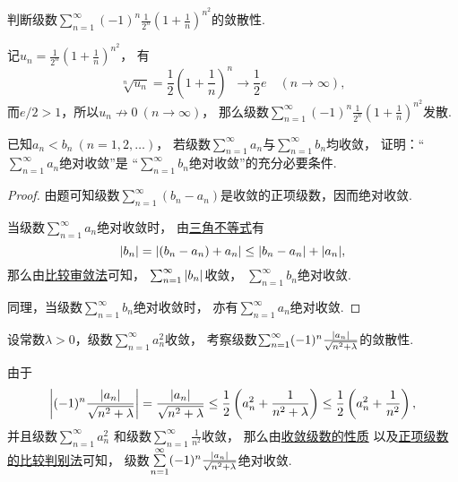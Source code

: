 \begin{example}
判断级数\(\sum_{n=1}^\infty (-1)^n \frac1{2^n} \left(1+\frac1n\right)^{n^2}\)的敛散性.
\begin{solution}
记\(u_n = \frac1{2^n} \left(1+\frac1n\right)^{n^2}\)，
有\[
	\sqrt[n]{u_n}
	= \frac12 \left(1+\frac1n\right)^n
	\to \frac12 e \quad(n\to\infty),
\]
而\(e/2>1\)，所以\(u_n \not\to 0\ (n\to\infty)\)，
那么级数\(\sum_{n=1}^\infty (-1)^n \frac1{2^n} \left(1+\frac1n\right)^{n^2}\)发散.
\end{solution}
\end{example}

\begin{example}
已知\(a_n < b_n\ (n=1,2,\dotsc)\)，
若级数\(\sum_{n=1}^\infty a_n\)与\(\sum_{n=1}^\infty b_n\)均收敛，
证明：“\(\sum_{n=1}^\infty a_n\)绝对收敛”是
“\(\sum_{n=1}^\infty b_n\)绝对收敛”的充分必要条件.
\begin{proof}
由题可知级数\(\sum_{n=1}^\infty (b_n - a_n)\)是收敛的正项级数，因而绝对收敛.

当级数\(\sum_{n=1}^\infty a_n\)绝对收敛时，
由\hyperref[theorem:不等式.三角不等式1]{三角不等式}有\[
	\abs{b_n} = \abs{(b_n - a_n) + a_n}
	\leq \abs{b_n - a_n} + \abs{a_n},
\]
那么由\hyperref[theorem:无穷级数.正项级数的比较审敛法]{比较审敛法}可知，
\(\sum_{n=1}^\infty \abs{b_n}\)收敛，
\(\sum_{n=1}^\infty b_n\)绝对收敛.

同理，当级数\(\sum_{n=1}^\infty b_n\)绝对收敛时，
亦有\(\sum_{n=1}^\infty a_n\)绝对收敛.
\end{proof}
\end{example}

\begin{example}
设常数\(\lambda>0\)，级数\(\sum_{n=1}^\infty a_n^2\)收敛，
考察级数\(\sum_{n=1}^\infty (-1)^n \frac{\abs{a_n}}{\sqrt{n^2+\lambda}}\)的敛散性.
\begin{solution}
由于\[
	\abs{(-1)^n \frac{\abs{a_n}}{\sqrt{n^2+\lambda}}}
	= \frac{\abs{a_n}}{\sqrt{n^2+\lambda}}
	\leq \frac{1}{2} \left( a_n^2 + \frac{1}{n^2+\lambda} \right)
	\leq \frac{1}{2} \left( a_n^2 + \frac{1}{n^2} \right),
\]
并且级数\(\sum\limits_{n=1}^\infty a_n^2\)
和级数\(\sum\limits_{n=1}^\infty \frac{1}{n^2}\)收敛，
那么由\hyperref[theorem:无穷级数.收敛级数性质2]{收敛级数的性质}%
以及\hyperref[theorem:无穷级数.正项级数的比较审敛法的推论]{正项级数的比较判别法}可知，
级数\(\sum\limits_{n=1}^\infty (-1)^n \frac{\abs{a_n}}{\sqrt{n^2+\lambda}}\)绝对收敛.
\end{solution}
\end{example}

